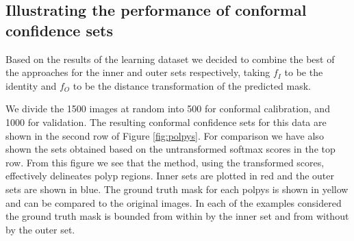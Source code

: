 \begin{figure}
	\label{fig:learning}
\end{figure}



\subsection{Illustrating the performance of conformal confidence sets}\label{SS:val}
Based on the results of the learning dataset we decided to combine the best of the approaches for the inner and outer sets respectively, taking $f_I$ to be the identity and $f_O$ to be the distance transformation of the predicted mask.

We divide the 1500 images at random into 500 for conformal calibration, and 1000 for validation. The resulting conformal confidence sets for this data are shown in the second row of Figure \ref{fig:polpys}. For comparison we have also shown the sets obtained based on the untransformed softmax scores in the top row. From this figure we see that the method, using the transformed scores, effectively delineates polyp regions. Inner sets are plotted in red and the outer sets are shown in blue. The ground truth mask for each polpys is shown in yellow and can be compared to the original images. In each of the examples considered the ground truth mask is bounded from within by the inner set and from without by the outer set. 

